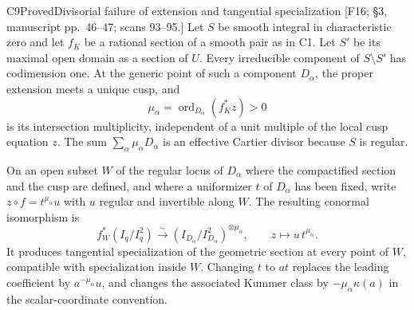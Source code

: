 \begin{result}{C9}{Proved}{Divisorial failure of extension and tangential specialization}
\textup{[F16; \S3, manuscript pp.\ 46--47; scans 93--95.]}
Let $S$ be smooth integral in characteristic zero and let $f_K$ be a
rational section of a smooth pair as in C1. Let $S'$ be its maximal
open domain as a section of $U$. Every irreducible component of
$S\setminus S'$ has codimension one. At the generic point of such a
component $D_\alpha$, the proper extension meets a unique cusp, and
\[
 \mu_\alpha=\operatorname{ord}_{D_\alpha}(f_K^*z)>0
\]
is its intersection multiplicity, independent of a unit multiple of
the local cusp equation $z$. The sum
$\sum_\alpha\mu_\alpha D_\alpha$ is an effective Cartier divisor
because $S$ is regular.

On an open subset $W$ of the regular locus of $D_\alpha$ where the
compactified section and the cusp are defined, and where a uniformizer
$t$ of $D_\alpha$ has been fixed, write
$z\circ f=t^{\mu_\alpha}u$ with $u$ regular and invertible along $W$.
The resulting conormal isomorphism is
\[
 f_W^*(I_q/I_q^2)\xrightarrow{\sim}
            (I_{D_\alpha}/I_{D_\alpha}^2)^{\otimes\mu_\alpha},
       \qquad z\longmapsto u\,t^{\mu_\alpha}.               \tag{C.7}
\]
It produces tangential specialization of the geometric section at
every point of $W$, compatible with specialization inside $W$. Changing
$t$ to $at$ replaces the leading coefficient by
$a^{-\mu_\alpha}u$, and changes the associated Kummer class by
$-\mu_\alpha\kappa(a)$ in the scalar-coordinate convention.
\end{result}

